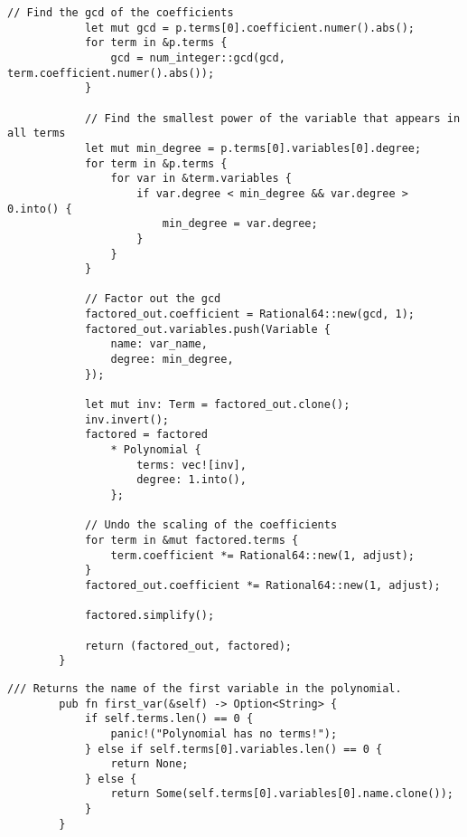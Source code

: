 \begin{lstlisting}[caption={The implementation of the \texttt{factor()} method for the \texttt{Polynomial} struct}, label={lst:polynomial-factor}]
            // Find the gcd of the coefficients
            let mut gcd = p.terms[0].coefficient.numer().abs();
            for term in &p.terms {
                gcd = num_integer::gcd(gcd, term.coefficient.numer().abs());
            }

            // Find the smallest power of the variable that appears in all terms
            let mut min_degree = p.terms[0].variables[0].degree;
            for term in &p.terms {
                for var in &term.variables {
                    if var.degree < min_degree && var.degree > 0.into() {
                        min_degree = var.degree;
                    }
                }
            }

            // Factor out the gcd
            factored_out.coefficient = Rational64::new(gcd, 1);
            factored_out.variables.push(Variable {
                name: var_name,
                degree: min_degree,
            });

            let mut inv: Term = factored_out.clone();
            inv.invert();
            factored = factored
                * Polynomial {
                    terms: vec![inv],
                    degree: 1.into(),
                };

            // Undo the scaling of the coefficients
            for term in &mut factored.terms {
                term.coefficient *= Rational64::new(1, adjust);
            }
            factored_out.coefficient *= Rational64::new(1, adjust);

            factored.simplify();

            return (factored_out, factored);
        }
    \end{lstlisting}

    \begin{lstlisting}[caption={The implementation of the \texttt{first\_var()} method for the \texttt{Polynomial} struct}, label={lst:polynomial-first-var}]
        /// Returns the name of the first variable in the polynomial.
        pub fn first_var(&self) -> Option<String> {
            if self.terms.len() == 0 {
                panic!("Polynomial has no terms!");
            } else if self.terms[0].variables.len() == 0 {
                return None;
            } else {
                return Some(self.terms[0].variables[0].name.clone());
            }
        }
    \end{lstlisting}

